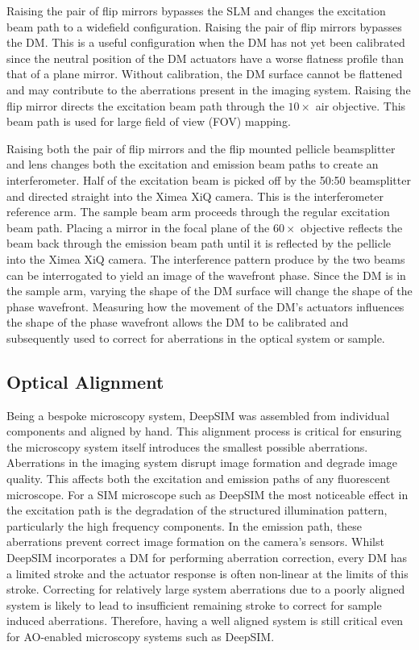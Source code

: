 Raising the  pair of flip mirrors bypasses the SLM and changes the excitation beam path to a widefield configuration. Raising the  pair of flip mirrors bypasses the DM. This is a useful configuration when the DM has not yet been calibrated since the neutral position of the DM actuators have a worse flatness profile than that of a plane mirror. Without calibration, the DM surface cannot be flattened and may contribute to the aberrations present in the imaging system. Raising the  flip mirror directs the excitation beam path through the $10 \times$ air objective. This beam path is used for large field of view (FOV) mapping.

Raising both the  pair of flip mirrors and the 
flip mounted pellicle beamsplitter and lens changes both the
excitation and emission beam paths to create an interferometer. Half
of the excitation beam is picked off by the 50:50 beamsplitter and
directed straight into the Ximea XiQ camera. This is the
interferometer reference arm. The sample beam arm proceeds through the
regular excitation beam path. Placing a mirror in the focal plane of
the $60\times$ objective reflects the beam back through the emission
beam path until it is reflected by the pellicle into the Ximea XiQ
camera. The interference pattern produce by the two beams can be interrogated to yield an image of the wavefront phase. Since the DM is in the sample arm, varying the shape of the DM surface will change the shape of the phase wavefront. Measuring how the movement of the DM's actuators influences the shape of the phase wavefront allows the DM to be calibrated and subsequently used to correct for aberrations in the optical system or sample. 

\subsection{Optical Alignment}
\label{subsec:alignment}

Being a bespoke microscopy system, DeepSIM was assembled from individual components and aligned by hand. This alignment process is critical for ensuring the microscopy system itself introduces the smallest possible aberrations. Aberrations in the imaging system disrupt image formation and degrade image quality\cite{wyant1992basic}. This affects both the excitation and emission paths of any fluorescent microscope. For a SIM microscope such as DeepSIM the most noticeable effect in the excitation path is the degradation of the structured illumination pattern, particularly the high frequency components\cite{debarre2008adaptive,booth2015aberrations}. In the emission path, these aberrations prevent correct image formation on the camera's sensors. Whilst DeepSIM incorporates a DM for performing aberration correction, every DM has a limited stroke and the actuator response is often non-linear at the limits of this stroke. Correcting for relatively large system aberrations due to a poorly aligned system is likely to lead to insufficient remaining stroke to correct for sample induced aberrations. Therefore, having a well aligned system is still critical even for AO-enabled microscopy systems such as DeepSIM.

